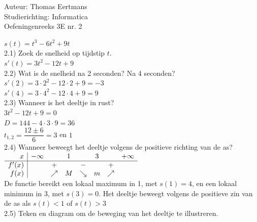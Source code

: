 \documentclass[a4paper]{article}
\begin{document}
  
\noindent \large Auteur: Thomas Eertmans \\
\noindent \large Studierichting: Informatica\\
\noindent \large Oefeningenreeks 3E nr. 2\\

\medskip

\normalsize

$s(t) = t^3 - 6t^2 + 9t$ \\

2.1) Zoek de snelheid op tijdstip $t$.\\

$s'(t) = 3t^2 - 12t + 9$ \\

2.2) Wat is de snelheid na 2 seconden? Na 4 seconden?\\

$s'(2) = 3 \cdot 2^2 - 12 \cdot 2 + 9 = -3$ \\

$s'(4) = 3 \cdot 4^2 - 12 \cdot 4 + 9 = 9$ \\

2.3) Wanneer is het deeltje in rust?\\

$3t^2 - 12t + 9 = 0$ \\

$D = 144 - 4 \cdot 3 \cdot 9 = 36$ \\

$t_{1,2} = \dfrac{12 \pm 6}{6} = 3$ en $1$ \\

2.4) Wanneer beweegt het deeltje volgens de positieve richting van de as?\\

$\begin{array}{r | c c c c c c c}
x & -\infty & & 1 & & 3 & & +\infty \\ \hline
f'(x) & & + & & - & & + \\ 
f(x) & & \nearrow & M & \searrow & m & \nearrow \\
\end{array}$ \\

De functie bereikt een lokaal maximum in 1, met $s(1) = 4$, en een lokaal minimum in 3, met $s(3) = 0$. Het deeltje beweegt volgens de positieve zin van de as als $s(t) < 1$ of $s(t) > 3$ \\

2.5) Teken en diagram om de beweging van het deeltje te illustreren.\\
\end{document}
